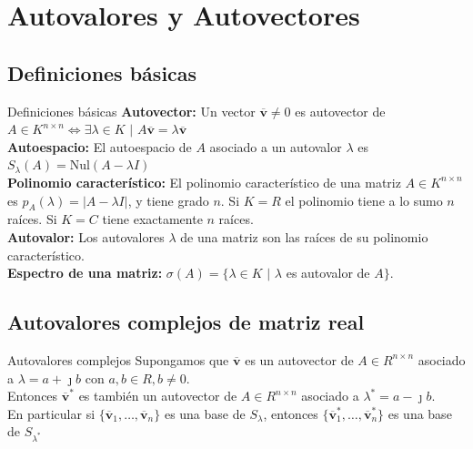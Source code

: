 \documentclass[a4paper, twoside]{article}
\numberwithin{equation}{section}
\numberwithin{figure}{section}
\numberwithin{table}{section}
\newcommand{\vect}[1]{\overline{\textbf{#1}}}
\newcommand{\nul}[1]{\text{Nul}(#1)}
\newcommand{\dete}[1]{\left\vert #1 \right\vert}
\begin{document}
\newpage
\section{Autovalores y Autovectores}
\subsection{Definiciones básicas}
\begin{definicion*}{Definiciones básicas}
	\textbf{Autovector:} Un vector $\vect{v} \neq 0$ es autovector de $A \in K^{n \times n} \Longleftrightarrow \exists \lambda \in K$ $\vert$ $A \vect{v}=\lambda \vect{v}$\\
			
	\textbf{Autoespacio:} El autoespacio de $A$ asociado a un autovalor $\lambda$ es $S_\lambda (A)=\nul{A-\lambda I}$\\
			
	\textbf{Polinomio característico:} El polinomio característico de una matriz $A \in K^{n \times n}$ es $p_A(\lambda)=\dete{A-\lambda I}$, y tiene grado $n$. Si $K=R$ el polinomio tiene a lo sumo $n$ raíces. Si $K=C$ tiene exactamente $n$ raíces.\\
			
	\textbf{Autovalor:} Los autovalores $\lambda$ de una matriz son las raíces de su polinomio característico.\\
			
	\textbf{Espectro de una matriz:} $\sigma (A)=\{ \lambda \in K$ $\vert$ $\lambda$ es autovalor de $A \}$.
\end{definicion*}

\subsection{Autovalores complejos de matriz real}
\begin{definicion*}{Autovalores complejos}
	Supongamos que $\vect{v}$ es un autovector de $A \in R^{n \times n}$ asociado a $\lambda=a+\jmath b$ con $a,b \in R,b \neq 0$.\\
	Entonces $\vect{v}^*$ es también un autovector de $A \in R^{n \times n}$ asociado a $\lambda^*=a-\jmath b$.\\
	
	En particular si $\{\vect{v}_1,\ldots,\vect{v}_n \}$ es una base de $S_\lambda$, entonces $\{\vect{v}_1^*,\ldots,\vect{v}_n^* \}$ es una base de $S_{\lambda^*}$
\end{definicion*}
\end{document}
